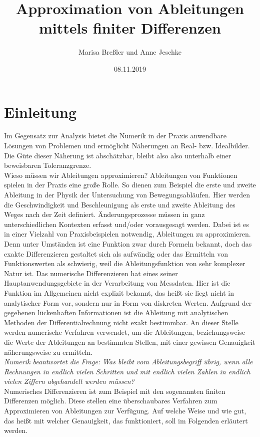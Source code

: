 \documentclass{scrartcl}
\begin{document}
\title{Approximation von Ableitungen\\mittels finiter Differenzen}
\author{Marisa Breßler und Anne Jeschke}
\date{08.11.2019}
\maketitle
\tableofcontents
\pagebreak \section{Einleitung}
\label{sec:einleitung}
Im Gegensatz zur Analysis bietet die Numerik in der Praxis anwendbare Lösungen von Problemen und ermöglicht Näherungen an Real- bzw. Idealbilder. Die Güte dieser Näherung ist abschätzbar, bleibt also also unterhalb einer beweisbaren Toleranzgrenze. \\
Wieso müssen wir Ableitungen approximieren? Ableitungen von Funktionen spielen in der Praxis eine große Rolle. So dienen zum Beispiel die erste und zweite Ableitung in der Physik der Untersuchung von Bewegungsabläufen. Hier werden die Geschwindigkeit und Beschleunigung als erste und zweite Ableitung des Weges nach der Zeit definiert. Änderungsprozesse müssen in ganz unterschiedlichen Kontexten erfasst und/oder vorausgesagt werden. Dabei ist es in einer Vielzahl von Praxisbeispielen notwendig, Ableitungen zu approximieren. Denn unter Umständen ist eine Funktion zwar durch Formeln bekannt, doch das exakte Differenzieren gestaltet sich als aufwändig oder das Ermitteln von Funktionswerten als schwierig, weil die Ableitungsfunktion von sehr komplexer Natur ist. Das numerische Differenzieren hat eines seiner Hauptanwendungsgebiete in der Verarbeitung von Messdaten. Hier ist die Funktion im Allgemeinen nicht explizit bekannt, das heißt sie liegt nicht in analytischer Form vor, sondern nur in Form von diskreten Werten. Aufgrund der gegebenen lückenhaften Informationen ist die Ableitung mit analytischen Methoden der Differentialrechnung nicht exakt bestimmbar. An dieser Stelle werden numerische Verfahren verwendet, um die Ableitungen, beziehungsweise die Werte der Ableitungen an bestimmten Stellen, mit einer gewissen Genauigkeit näherungsweise zu ermitteln. \\
\linebreak
\textit{Numerik beantwortet die Frage: Was bleibt vom Ableitungsbegriff übrig, wenn alle Rechnungen in endlich vielen Schritten und mit endlich vielen Zahlen in endlich vielen Ziffern abgehandelt werden müssen?}\cite{schneebeli}\\
\linebreak
Numerisches Differenzieren ist zum Beispiel mit den sogenannten finiten Differenzen möglich. Diese stellen eine überschaubares Verfahren zum Approximieren von Ableitungen zur Verfügung. Auf welche Weise und wie gut, das heißt mit welcher Genauigkeit, das funktioniert, soll im Folgenden erläutert werden. \\
\end{document}
